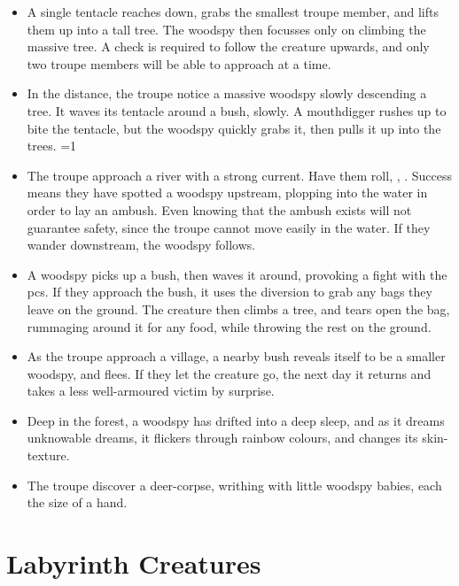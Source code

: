 \begin{multicols}{2}
\begin{itemize}
  \item
  A single tentacle reaches down, grabs the smallest troupe member, and lifts them up into a tall tree.
  The woodspy then focusses only on climbing the massive tree.
  A  check is required to follow the creature upwards, and only two troupe members will be able to approach at a time.
  \item
  In the distance, the troupe notice a massive woodspy slowly descending a tree.
  It waves its tentacle around a bush, slowly.
  A mouthdigger rushes up to bite the tentacle, but the woodspy quickly grabs it, then pulls it up into the trees.
  \ifnum\value{temperature}=1
    \item
    The troupe approach a river with a strong current.
    Have them roll, , \tn[9].
    Success means they have spotted a woodspy upstream, plopping into the water in order to lay an ambush.
    Even knowing that the ambush exists will not guarantee safety, since the troupe cannot move easily in the water.
    If they wander downstream, the woodspy follows.
    \item
    A woodspy picks up a bush, then waves it around, provoking a fight with the \glspl{pc}.
    If they approach the bush, it uses the diversion to grab any bags they leave on the ground.
    The creature then climbs a tree, and tears open the bag, rummaging around it for any food, while throwing the rest on the ground.
  \else
    \item
    As the troupe approach a village, a nearby bush reveals itself to be a smaller woodspy, and flees.
    If they let the creature go, the next day it returns and takes a less well-armoured victim by surprise.
    \item
    Deep in the forest, a woodspy has drifted into a deep sleep, and as it dreams unknowable dreams, it flickers through rainbow colours, and changes its skin-texture.
    \item
    The troupe discover a deer-corpse, writhing with little woodspy babies, each the size of a hand.
  \fi
\end{itemize}

\end{multicols}

\section[Labyrinth Creatures]{Labyrinth Creatures \A}

